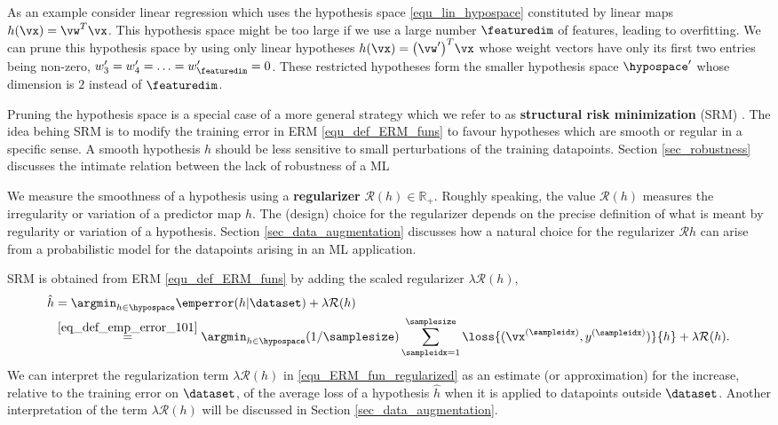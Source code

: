 \documentclass[12pt]{report}
\newcommand{\featurelen}{\featuredim}
\begin{document}
As an example consider linear regression which uses the hypothesis space \eqref{equ_lin_hypospace} 
constituted by linear maps $h(\vx) = \vw^{T} \vx$. This hypothesis space might be 
too large if we use a large number $\featurelen$ of features, leading to overfitting. 
We can prune this hypothesis space by using only linear hypotheses $h(\vx) = \big(\vw'\big)^T \vx$ 
whose weight vectors have only its first two entries being non-zero, $w'_{3} = w_{4}'= \ldots = w_{\featurelen}'=0$. 
These restricted hypotheses form the smaller hypothesis space $\hypospace'$ whose 
dimension is $2$ instead of $\featurelen$. 

Pruning the hypothesis space is a special case of a more general strategy which we  
refer to as {\bf structural risk minimization} (SRM) \cite{VapnikBook}. The idea behing 
SRM is to modify the training error in ERM \eqref{equ_def_ERM_funs} to favour hypotheses 
which are smooth or regular in a specific sense. A smooth hypothesis $h$ should be less 
sensitive to small perturbations of the training datapoints. Section \ref{sec_robustness} discusses 
the intimate relation between the lack of robustness of a ML 

We measure the smoothness of a hypothesis using a {\bf regularizer} $\mathcal{R}(h) \in \mathbb{R}_{+}$. 
Roughly speaking, the value $\mathcal{R}(h)$ measures the irregularity or variation of a predictor map $h$. 
The (design) choice for the regularizer depends on the precise definition of what is meant by regularity 
or variation of a hypothesis. Section \ref{sec_data_augmentation} discusses how a natural choice for the 
regularizer $\mathcal{R}{h}$ can arise from a probabilistic model for the datapoints arising in an ML application. 

SRM is obtained from ERM \eqref{equ_def_ERM_funs} by adding the scaled regularizer $\lambda \mathcal{R}(h)$, 
\begin{align}
\label{equ_ERM_fun_regularized}
\hat{h} & = \argmin_{h \in \hypospace} \emperror(h|\dataset)  + \lambda \mathcal{R}(h) \nonumber \\
   &   \stackrel{\eqref{eq_def_emp_error_101}}{=}  \argmin_{h \in \hypospace} (1/\samplesize) \sum_{\sampleidx=1}^{\samplesize} \loss{(\vx^{(\sampleidx)},y^{(\sampleidx)})}{h}+ \lambda \mathcal{R}(h). 
\end{align} 
We can interpret the regularization term $\lambda \mathcal{R}(h)$ in \eqref{equ_ERM_fun_regularized} as an estimate 
(or approximation) for the increase, relative to the training error on $\dataset$, of the average loss of a hypothesis $\hat{h}$ 
when it is applied to datapoints outside $\dataset$. Another interpretation of the term $\lambda \mathcal{R}(h)$ will be 
discussed in Section \ref{sec_data_augmentation}. 
\end{document}
